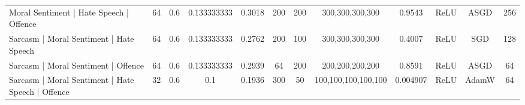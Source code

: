 \begin{landscape}
\begin{table}[]
{\begin{tabular}{l|ccccccccccc}
      Moral Sentiment | Hate Speech | Offence                            & 64         & 0.6              & 0.133333333      & 0.3018  & 200           & 200    & 300,300,300,300         & 0.9543        & ReLU          & ASGD      & 256        \\
      Sarcasm | Moral Sentiment | Hate Speech                            & 64         & 0.6              & 0.133333333      & 0.2762  & 200           & 100    & 300,300,300,300         & 0.4007        & ReLU          & SGD       & 128        \\
      Sarcasm | Moral Sentiment | Offence                                & 64         & 0.6              & 0.133333333      & 0.2939  & 64            & 200    & 200,200,200,200         & 0.8591        & ReLU          & ASGD      & 64         \\
      Sarcasm | Moral Sentiment | Hate Speech | Offence                  & 32         & 0.6              & 0.1              & 0.1936  & 300           & 50     & 100,100,100,100,100     & 0.004907      & ReLU          & AdamW     & 64         \\

\end{tabular}}
\end{table}
\end{landscape}
